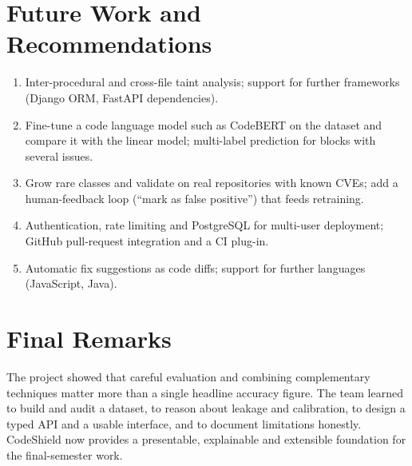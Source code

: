 \documentclass[11pt,a4paper,twoside]{report}
\begin{document}
\section{Future Work and Recommendations}
\begin{enumerate}[noitemsep]
  \item Inter-procedural and cross-file taint analysis; support for further frameworks (Django ORM, FastAPI dependencies).
  \item Fine-tune a code language model such as CodeBERT on the dataset and compare it with the linear model; multi-label prediction for blocks with several issues.
  \item Grow rare classes and validate on real repositories with known CVEs; add a human-feedback loop (``mark as false positive'') that feeds retraining.
  \item Authentication, rate limiting and PostgreSQL for multi-user deployment; GitHub pull-request integration and a CI plug-in.
  \item Automatic fix suggestions as code diffs; support for further languages (JavaScript, Java).
\end{enumerate}

\section{Final Remarks}
The project showed that careful evaluation and combining complementary techniques matter more than a single headline accuracy figure. The team learned to build and audit a dataset, to reason about leakage and calibration, to design a typed API and a usable interface, and to document limitations honestly. CodeShield now provides a presentable, explainable and extensible foundation for the final-semester work.
\end{document}
